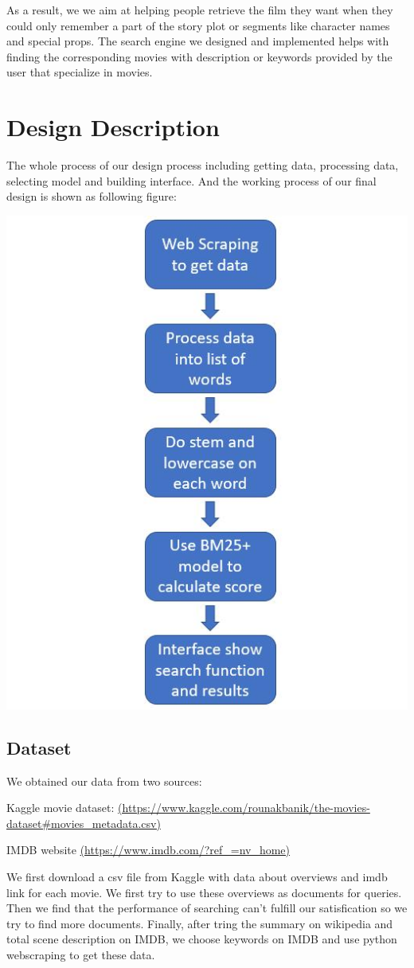\documentclass[letterpaper,10pt]{article}
\newenvironment{Figure}
  {\par\medskip\noindent\minipage{\linewidth}}
  {\endminipage\par\medskip}
\begin{document}
\begin{multicols}{2}
As a result, we we aim at helping people retrieve the film they want when they could only remember a part of the story plot or segments like character names and special props. The search engine we designed and implemented helps with finding the corresponding movies with description or keywords provided by the user that specialize in movies.

    \section{Design Description}

	The whole process of our design process including getting data, processing data, selecting model and building interface. And the working process of our final design is shown as following figure:
	
	\begin{Figure}
    	\center
  		\includegraphics[width=0.5\linewidth]{process.jpg}
	\end{Figure}

    \subsection{Dataset}
    We obtained our data from two sources:

    Kaggle movie dataset:
    \url{(https://www.kaggle.com/rounakbanik/the-movies-dataset#movies_metadata.csv)}

    IMDB website
    \url{(https://www.imdb.com/?ref_=nv_home)}
    
    We first download a csv file from Kaggle with data about overviews and imdb link for each movie. We first try to use these overviews as documents for queries. Then we find that the performance of searching can't fulfill our satisfication so we try to find more documents. Finally, after tring the summary on wikipedia and total scene description on IMDB, we choose keywords on IMDB and use python webscraping to get these data.


\end{multicols}
\end{document}
